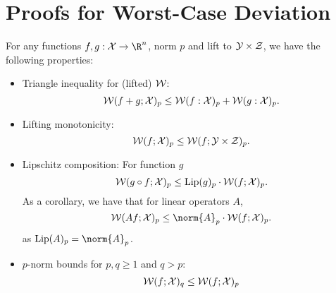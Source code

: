 \section{Proofs for Worst-Case Deviation}
\label{sec:proofs_worst_case_deviation}

\begin{lemma}
	\label{lemma:worst_case_deviation_properties}
	For any functions $f, g: \calX \to \R^n$, norm $p$ and lift to $\mathcal{Y} \times \mathcal{Z}$, we have the following properties:
	\begin{itemize}[nosep]
		\item Triangle inequality for (lifted) $\mathcal{W}$:	
			\[
				\mathcal{W}(f + g; \mathcal{X})_p \leq \mathcal{W}(f : \mathcal{X})_p + \mathcal{W}(g : \mathcal{X})_p.
			\]
		\item Lifting monotonicity:
			\[
				\mathcal{W}(f; \mathcal{X})_p \leq \mathcal{W}(f; \mathcal{Y} \times \mathcal{Z})_p.
			\]
		\item Lipschitz composition:
			For function $g$
               \[
				\mathcal{W}(g \circ f; \mathcal{X})_p \leq \mathrm{Lip}(g)_p \cdot \mathcal{W}(f; \mathcal{X})_p.
			\]
		As a corollary, we have that for linear operators $A$,
		\[
			\WD(A f; \calX)_p \leq \norm{A}_p \cdot \WD(f; \calX)_p.
		\]
		as $\Lip(A)_p = \norm{A}_p$.

		\item $p$-norm bounds for $p, q \geq 1$ and $q > p$:
			\[
				\mathcal{W}(f; \mathcal{X})_q \leq \mathcal{W}(f; \mathcal{X})_p
			\]
	\end{itemize}
\end{lemma}


